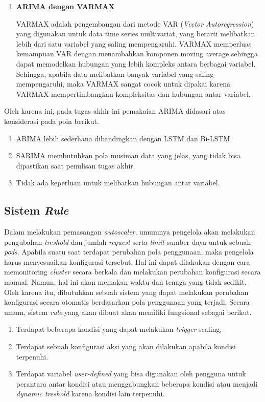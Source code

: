 \begin{enumerate}
    \item \textbf{ARIMA dengan VARMAX}
    
    VARMAX adalah pengembangan dari metode VAR (\textit{Vector Autoregression}) yang digunakan untuk data time series multivariat, yang berarti melibatkan lebih dari satu variabel yang saling mempengaruhi. VARMAX memperluas kemampuan VAR dengan menambahkan komponen moving average sehingga dapat memodelkan hubungan yang lebih kompleks antara berbagai variabel. Sehingga, apabila data melibatkan banyak variabel yang saling mempengaruhi, maka VARMAX sangat cocok untuk dipakai karena VARMAX mempertimbangkan kompleksitas dan hubungan antar variabel.

\end{enumerate}

Oleh karena ini, pada tugas akhir ini pemakaian ARIMA didasari atas konsiderasi pada poin berikut.

\begin{enumerate}
    \item ARIMA lebih sederhana dibandingkan dengan LSTM dan Bi-LSTM.
    \item SARIMA membutuhkan pola musiman data yang jelas, yang tidak bisa dipastikan saat penulisan tugas akhir.
    \item Tidak ada keperluan untuk melibatkan hubungan antar variabel.
\end{enumerate}

\subsection{Sistem \textit{Rule}}

Dalam melakukan pemasangan \textit{autoscaler}, umumnya pengelola akan melakukan pengubahan \textit{treshold} dan jumlah \textit{request} serta \textit{limit} sumber daya untuk sebuah \textit{pods}. Apabila suatu saat terdapat perubahan pola penggunaan, maka pengelola harus menyesuaikan konfigurasi tersebut. Hal ini dapat dilakukan dengan cara memonitoring \textit{cluster} secara berkala dan melakukan perubahan konfigurasi secara manual. Namun, hal ini akan memakan waktu dan tenaga yang tidak sedikit. Oleh karena itu, dibutuhkan sebuah sistem yang dapat melakukan perubahan konfigurasi secara otomatis berdasarkan pola penggunaan yang terjadi. Secara umum, sistem \textit{rule} yang akan dibuat akan memiliki fungsional sebagai berikut.

\begin{enumerate}
    \item Terdapat beberapa kondisi yang dapat melakukan \textit{trigger} scaling.
    \item Terdapat sebuah konfigurasi aksi yang akan dilakukan apabila kondisi terpenuhi.
    \item Terdapat variabel \textit{user-defined} yang bisa digunakan oleh pengguna untuk perantara antar kondisi atau menggabungkan beberapa kondisi atau menjadi \textit{dynamic treshold} karena kondisi lain terpenuhi.
\end{enumerate}

